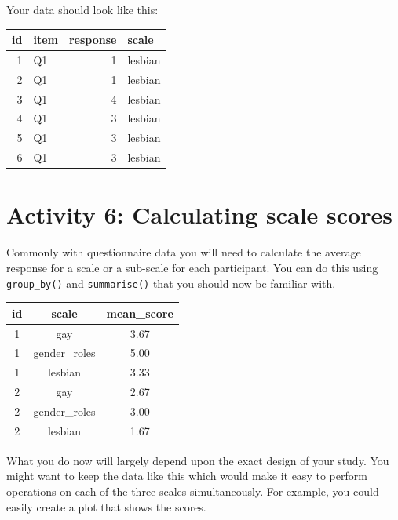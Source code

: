 \documentclass[]{book}
\newenvironment{Shaded}{\begin{snugshade}}{\end{snugshade}}
\newcommand{\DataTypeTok}[1]{\textcolor[rgb]{0.13,0.29,0.53}{#1}}
\newcommand{\KeywordTok}[1]{\textcolor[rgb]{0.13,0.29,0.53}{\textbf{#1}}}
\newcommand{\NormalTok}[1]{#1}
\newcommand{\OperatorTok}[1]{\textcolor[rgb]{0.81,0.36,0.00}{\textbf{#1}}}
\newcommand{\StringTok}[1]{\textcolor[rgb]{0.31,0.60,0.02}{#1}}
\begin{document}
Your data should look like this:

\begin{tabular}{r|l|r|l}
\hline
id & item & response & scale\\
\hline
1 & Q1 & 1 & lesbian\\
\hline
2 & Q1 & 1 & lesbian\\
\hline
3 & Q1 & 4 & lesbian\\
\hline
4 & Q1 & 3 & lesbian\\
\hline
5 & Q1 & 3 & lesbian\\
\hline
6 & Q1 & 3 & lesbian\\
\hline
\end{tabular}

\hypertarget{activity-6-calculating-scale-scores}{%
\section{Activity 6: Calculating scale scores}\label{activity-6-calculating-scale-scores}}

Commonly with questionnaire data you will need to calculate the average response for a scale or a sub-scale for each participant. You can do this using \texttt{group\_by()} and \texttt{summarise()} that you should now be familiar with.

\begin{Shaded}
\end{Shaded}

\begin{tabular}{c|c|c}
\hline
id & scale & mean\_score\\
\hline
1 & gay & 3.67\\
\hline
1 & gender\_roles & 5.00\\
\hline
1 & lesbian & 3.33\\
\hline
2 & gay & 2.67\\
\hline
2 & gender\_roles & 3.00\\
\hline
2 & lesbian & 1.67\\
\hline
\end{tabular}

What you do now will largely depend upon the exact design of your study. You might want to keep the data like this which would make it easy to perform operations on each of the three scales simultaneously. For example, you could easily create a plot that shows the scores.
\end{document}
